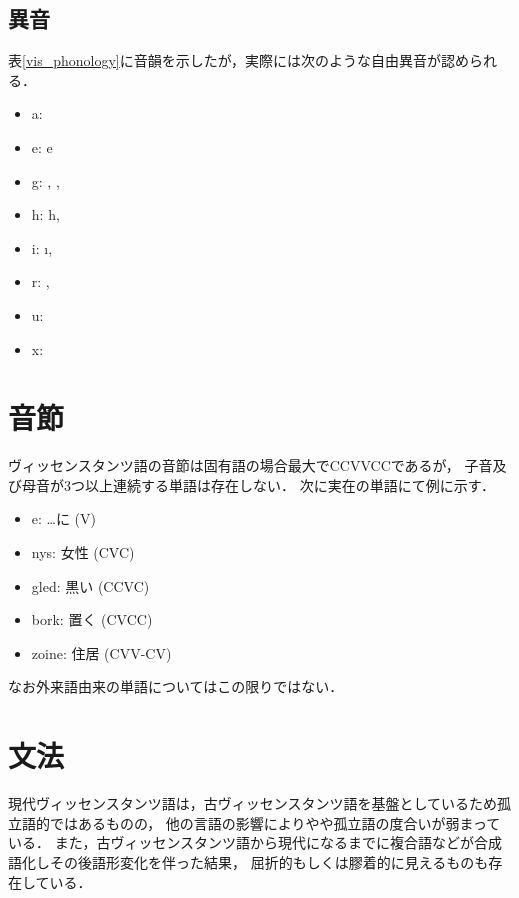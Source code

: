 \documentclass[a4paper,xelatex,ja=standard]{bxjsarticle}
\begin{document}
\subsection{異音}
表\ref{vis_phonology}に音韻を示したが，実際には次のような自由異音が認められる．
\begin{itemize}
 \item a: {\charis \textscripta}
 \item e: {\charis e}
 \item g: {\charis \textgamma, \textinvscr, \textscr}
 \item h: {\charis h,\textchi}
 \item i: {\charis \i, \textbari}
 \item r: {\charis \textfishhookr, \textturnr}
 \item u: {\charis \textbaru}
 \item x: {\charis \textctc}
\end{itemize}

\section{音節}
ヴィッセンスタンツ語の音節は固有語の場合最大でCCVVCCであるが，
子音及び母音が3つ以上連続する単語は存在しない．
次に実在の単語にて例に示す．
\begin{itemize}
 \item e: …に (V)
 \item nys: 女性 (CVC)
 \item gled: 黒い (CCVC)
 \item bork: 置く (CVCC)
 \item zoine: 住居 (CVV-CV)
\end{itemize}
なお外来語由来の単語についてはこの限りではない．

\section{文法}
現代ヴィッセンスタンツ語は，古ヴィッセンスタンツ語を基盤としているため孤立語的ではあるものの，
他の言語の影響によりやや孤立語の度合いが弱まっている．
また，古ヴィッセンスタンツ語から現代になるまでに複合語などが合成語化しその後語形変化を伴った結果，
屈折的もしくは膠着的に見えるものも存在している．

\end{document}
